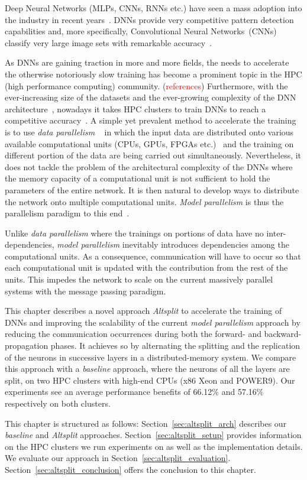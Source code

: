 Deep Neural Networks (MLPs, CNNs, RNNs etc.) have seen a mass adoption into the
industry in recent years~\cite{Acoustic, Language, Ciregan2012}. DNNs provide
very competitive pattern detection capabilities and, more specifically,
Convolutional Neural Networks~(CNNs) classify very large image sets with
remarkable accuracy~\cite{Krizhevsky2012}. 

As DNNs are gaining traction in more and more fields, the needs to accelerate
the otherwise notoriously slow training has become a prominent topic in the
HPC (high performance computing) community. (\textcolor{red}{references})
Furthermore, with the ever-increasing size of the datasets and the
ever-growing complexity of the DNN architecture~\cite{resnet, Inception,
transformersXL}, nowadays it takes HPC clusters to train DNNs to reach a
competitive accuracy~\cite{model0}. A simple yet prevalent method to
accelerate the training is to use \emph{data parallelism} ~\cite{model1,
pserver} in which the input data are distributed onto various available
computational units (CPUs, GPUs, FPGAs etc.)~\cite{You17, fpga_dnn, tpu} and
the training on different portion of the data are being carried out
simultaneously. Nevertheless, it does not tackle the problem of the
architectural complexity of the DNNs where the memory capacity of a
computational unit is not sufficient to hold the parameters of the entire
network. It is then natural to develop ways to distribute the network onto
multiple computational units. \emph{Model parallelism} is thus the
parallelism paradigm to this end~\cite{model0,model1}.

Unlike \emph{data parallelism} where the trainings on portions of data have
no inter-dependencies, \emph{model parallelism} inevitably introduces
dependencies among the computational units. As a consequence, communication
will have to occur so that each computational unit is updated with the
contribution from the rest of the units. This impedes the network to scale on
the current massively parallel systems with the message passing paradigm.

This chapter describes a novel approach \emph{Altsplit} to accelerate the
training of DNNs and improving the scalability of the current \emph{model 
parallelism} approach by reducing the communication occurrences during both the
forward- and backward- propagation phases. It achieves so by alternating the
splitting and the replication of the neurons in successive layers in a
distributed-memory system. We compare this approach with a \emph{baseline}
approach, where the neurons of all the layers are split, on two HPC clusters
with high-end CPUs (x86 Xeon and POWER9). Our experiments see an average
performance benefits of 66.12\% and 57.16\% respectively on both clusters.

This chapter is structured as follows: Section~\ref{sec:altsplit_arch} describes 
our \emph{baseline} and \emph{Altsplit} approaches. 
Section~\ref{sec:altsplit_setup} provides information on the HPC clusters we run 
experiments on as well as the implementation details. We evaluate our approach 
in Section~\ref{sec:altsplit_evaluation}.
Section~\ref{sec:altsplit_conclusion} offers the conclusion to this chapter.
